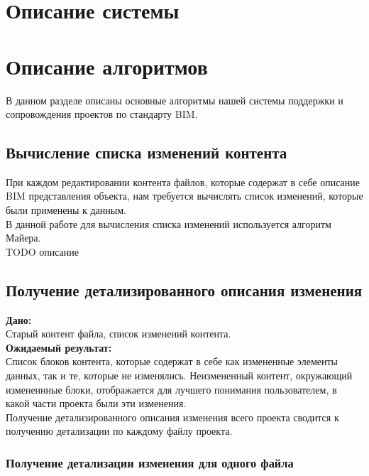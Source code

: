\documentclass[a4paper,14pt]{extreport} %
\begin{document}
\newpage
\section{Описание системы}


\newpage
\section{Описание алгоритмов}
В данном разделе описаны основные алгоритмы нашей системы поддержки и сопровождения проектов по стандарту BIM.

\subsection{Вычисление списка изменений контента} 
При каждом редактировании контента файлов, которые содержат в себе описание BIM представления объекта, нам требуется вычислять список изменений, которые были применены к данным. \\
В данной работе для вычисления списка изменений используется алгоритм Майера. \\
TODO описание

\newpage
\subsection{Получение детализированного описания изменения} 
\textbf{Дано:} \\
Старый контент файла, список изменений контента. \\
\textbf{Ожидаемый результат:} \\
Список блоков контента, которые содержат в себе как измененные элементы данных, так и те, которые не изменялись. Неизмененный контент, окружающий измененнные блоки, отображается для лучшего понимания пользователем, в какой части проекта были эти изменения. \\
Получение детализированного описания изменения всего проекта сводится к получению детализации по каждому файлу проекта.

\subsubsection{Получение детализации изменения для одного файла}
\end{document}
